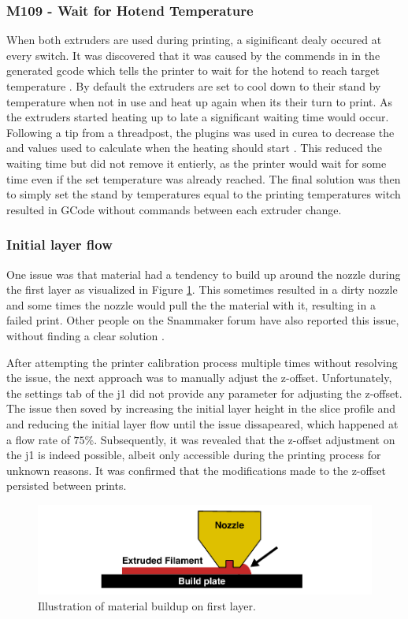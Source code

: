 \subsubsection{M109 - Wait for Hotend Temperature}
When both extruders are used during printing, a siginificant dealy occured at every switch.
It was discovered that it was caused by the  commends in in the generated \gls{gcode} which tells the printer to wait for the hotend to reach target temperature \cite{thinkyheadWaitHotendTemperature2023}.
By default the extruders are set to cool down to their stand by temperature when not in use and heat up again when its their turn to print.
As the extruders started heating up to late a significant waiting time would occur.
Following a tip from a threadpost, the  plugins was used in curea to decrease the  and  values used to calculate when the heating should start \cite{valiantReplyStandbyTemperature2022} \cite{fieldofviewPrinterSettingsUltimaker}.
This reduced the waiting time but did not remove it entierly, as the printer would wait for some time even if the set temperature was already reached.
The final solution was then to simply set the stand by temperatures equal to the printing temperatures witch resulted in GCode without  commands between each extruder change.


\subsubsection{Initial layer flow}
One issue was that material had a tendency to build up around the nozzle during the first layer as visualized in Figure \ref{fig:first_layer_buildup}.
This sometimes resulted in a dirty nozzle and some times the nozzle would pull the the material with it, resulting in a failed print.
Other people on the Snammaker forum have also reported this issue, without finding a clear solution \cite{artezioFinerAdjustmentsOffset2021} \cite{napsZHeightCalibrationOffset2023}.

After attempting the printer calibration process multiple times without resolving the issue, the next approach was to manually adjust the z-offset.
Unfortunately, the settings tab of the \gls{j1} did not provide any parameter for adjusting the z-offset.
The issue then soved by increasing the initial layer height in the slice profile and and reducing the initial layer flow until the issue dissapeared, which happened at a flow rate of $75\%$.
Subsequently, it was revealed that the z-offset adjustment on the \gls{j1} is indeed possible, albeit only accessible during the printing process for unknown reasons.
It was confirmed that the modifications made to the z-offset persisted between prints.

\begin{figure}[H]
    \centering
    \includegraphics[width=\textwidth]{figures/3d_print/first_layer_buildup.pdf}
    \caption{Illustration of material buildup on first layer.}
    \label{fig:first_layer_buildup}
\end{figure}